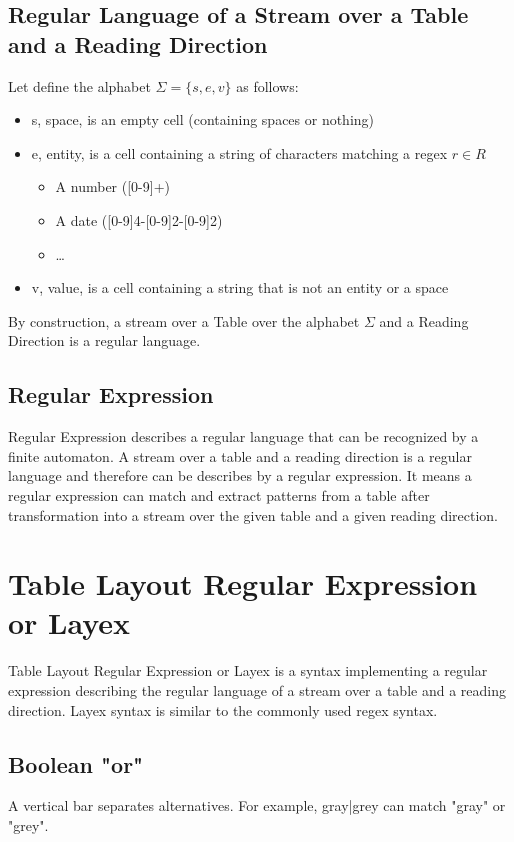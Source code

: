 \documentclass{article}
\begin{document}
\subsection{Regular Language of a Stream over a Table and a Reading Direction}
Let define the alphabet $\Sigma = \{s, e, v\}$ as follows:
\begin{itemize}
    \item s, space, is an empty cell (containing spaces or nothing)
    \item e, entity, is a cell containing a string of characters matching a regex $r \in R$
    \begin{itemize}
        \item A number ([0-9]+)
        \item A date ([0-9]{4}-[0-9]{2}-[0-9]{2})
        \item …
    \end{itemize}
\item v, value, is a cell containing a string that is not an entity or a space
\end{itemize}
By construction, a stream over a Table over the alphabet $\Sigma$ and a Reading Direction is a regular language.

\subsection{Regular Expression}
Regular Expression describes a regular language that can be recognized by a finite automaton. A stream over a table and
a reading direction is a regular language and therefore can be describes by a regular expression. It means a regular
expression can match and extract patterns from a table after transformation into a stream over the given table and a
given reading direction.

\section{Table Layout Regular Expression or Layex}
Table Layout Regular Expression or Layex is a syntax implementing a regular expression describing the regular language
of a stream over a table and a reading direction. Layex syntax is similar to the commonly used regex syntax.

\subsection{Boolean "or"}
A vertical bar separates alternatives. For example, gray|grey can match "gray" or "grey".
\end{document}
